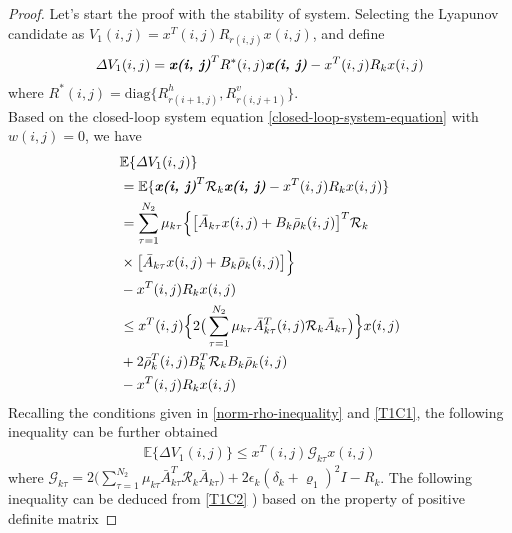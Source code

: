 \documentclass[journal,final,twocolumn]{IEEEtran}
\begin{document}
\begin{proof}
	Let's start the proof with the stability of system. Selecting the Lyapunov candidate as $V_{1}(i,j) = x^{T}(i,j)R_{r(i,j)}x(i,j)$, and define 
	\begin{equation}\label{VAR-DELTA-V1}
		\begin{split}
			\varDelta V_{1}(i,j) = \emph{\textbf{x(i, j)}}^{T} R^{*}(i,j) \emph{\textbf{x(i, j)}} - x^{T}(i,j)R_{k}x(i,j)
		\end{split}
	\end{equation}
	where $R^{*}(i,j)=\mathrm{diag}\{R^{h}_{r(i+1,j)},R^{v}_{r(i,j+1)}\}$.\\
	Based on the closed-loop system equation \eqref{closed-loop-system-equation} with $w(i,j)=0$, we have 
	\begin{equation}
	\begin{split}
	&\mathbb{E}\{\varDelta V_{1}(i,j) \}\\
	&=\mathbb{E}\{\emph{\textbf{x(i, j)}}^{T}\mathcal{R}_{k}\emph{\textbf{x(i, j)}} - x^{T}(i,j)R_{k}x(i,j) \} \\
	&=  \sum_{\tau =1}^{N_{2}}\mu_{k\tau }\Big\{\big[\bar{A}_{k\tau }x(i,j)+B_{k}\bar{\rho}_{k}(i,j)\big]^{T}\mathcal{R}_{k}\\
	&\times\big[\bar{A}_{k\tau }x(i,j)+B_{k}\bar{\rho}_{k}(i,j)\big]\Big\}\\
	&- x^{T}(i,j)R_{k}x(i,j) \\
	&\leq x^{T}(i,j) \Big\{2\big(\sum_{\tau =1}^{N_{2}}\mu_{k\tau }\bar{A}^{T}_{k\tau }(i,j)\mathcal{R}_{k}\bar{A}_{k\tau }\big)\Big\}x(i,j)\\ &+2\bar{\rho}^{T}_{k}(i,j)B^{T}_{k}\mathcal{R}_{k}B_{k}\bar{\rho}_{k}(i,j) \\
	&-  x^{T}(i,j)R_{k}x(i,j)
	\end{split}
	\end{equation}
	Recalling the conditions given in \eqref{norm-rho-inequality} and \eqref{T1C1}, the following inequality can be further obtained
	\begin{equation}\label{combine-one-1}
	\begin{split}
		\mathbb{E}\{\varDelta  V_{1}(i,j) \} \leq x^{T}(i,j)\mathcal{G}_{k\tau }x(i,j)
	\end{split}
	\end{equation}
	where $\mathcal{G}_{k\tau }= 2\big(\sum_{\tau =1}^{N_{2}}\mu_{k\tau }\bar{A}^{T}_{k\tau }\mathcal{R}_{k}\bar{A}_{k\tau }\big)
	+ 2\epsilon_{k}(\delta_{k}+\varrho_{1})^{2}I- R_{k}$.
	The following inequality can be deduced from \eqref{T1C2} ) based on the property of positive definite matrix

\end{proof}
\end{document}
